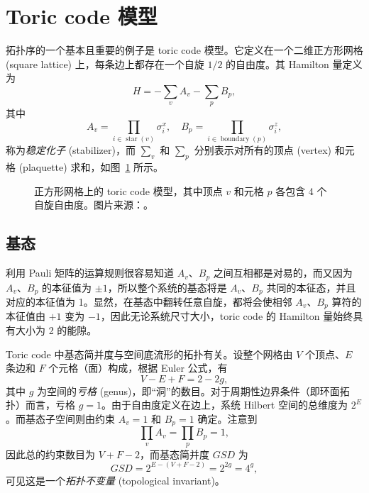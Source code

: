 \section{Toric code 模型}

拓扑序的一个基本且重要的例子是 toric code 模型\cite{kitaev2003fault,kong2022invitation}。它定义在一个二维正方形网格 (square lattice) 上，每条边上都存在一个自旋 $1/2$ 的自由度。其 Hamilton 量定义为
\begin{equation}
  H = -\sum_v A_v - \sum_p B_p,
  \label{eq:toric-code-hamiltonian}
\end{equation}
其中
\begin{equation}
  A_v = \prod_{i\in\operatorname{star}(v)} \sigma_i^x, \quad
  B_p = \prod_{i\in\operatorname{boundary}(p)} \sigma_i^z,
\end{equation}
称为\emph{稳定化子} (stabilizer)，而 $\sum_v$ 和 $\sum_p$ 分别表示对所有的顶点 (vertex) 和元格 (plaquette) 求和，如图~\ref{fig:toric-code} 所示。

\begin{figure}[htb]
  \centering
  \caption[正方形网格上的 toric code 模型]{正方形网格上的 toric code 模型，其中顶点 $v$ 和元格 $p$ 各包含 4 个自旋自由度。图片来源：\parencite{kong2022invitation}。}
  \label{fig:toric-code}
\end{figure}

\subsection{基态}

利用 Pauli 矩阵的运算规则很容易知道 $A_v$、$B_p$ 之间互相都是对易的，而又因为 $A_v$、$B_p$ 的本征值为 $\pm1$，所以整个系统的基态将是 $A_v$、$B_p$ 共同的本征态，并且对应的本征值为 1。显然，在基态中翻转任意自旋，都将会使相邻 $A_v$、$B_p$ 算符的本征值由 $+1$ 变为 $-1$，因此无论系统尺寸大小，toric code 的 Hamilton 量始终具有大小为 2 的能隙。

Toric code 中基态简并度与空间底流形的拓扑有关。设整个网格由 $V$ 个顶点、$E$ 条边和 $F$ 个元格（面）构成，根据 Euler 公式，有
\begin{equation}
  V - E + F = 2 - 2g,
\end{equation}
其中 $g$ 为空间的\emph{亏格} (genus)，即“洞”的数目。对于周期性边界条件（即环面拓扑）而言，亏格 $g=1$。由于自由度定义在边上，系统 Hilbert 空间的总维度为 $2^E$。而基态子空间则由约束 $A_v=1$ 和 $B_p=1$ 确定。注意到
\begin{equation}
  \prod_v A_v = \prod_p B_p = 1,
\end{equation}
因此总的约束数目为 $V+F-2$，而基态简并度 $\mathit{GSD}$ 为
\begin{equation}
  \mathit{GSD} = 2^{E-(V+F-2)} = 2^{2g} = 4^g,
\end{equation}
可见这是一个\emph{拓扑不变量} (topological invariant)。

